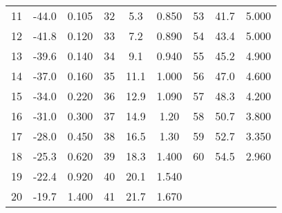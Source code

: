\begin{table}
\begin{tabular}{c c c@{\hskip 1cm}||@{\hskip 1cm} c c c@{\hskip 1cm} ||@{\hskip 1cm} c c c}
11   & -44.0   &    0.105 & 32      &  5.3       & 0.850  &  53  &      41.7  &           5.000    \\
12   & -41.8   &    0.120  & 33      &  7.2       & 0.890  &  54  &      43.4  &           5.000  \\
13   & -39.6   &    0.140  & 34      &  9.1       & 0.940  &  55  &      45.2  &           4.900 \\
14   & -37.0     &    0.160  & 35      &  11.1      & 1.000     &  56  &      47.0  &           4.600 \\
15   & -34.0   &    0.220  & 36      &  12.9      & 1.090  &  57  &      48.3  &           4.200 \\
16   & -31.0     &    0.300   & 37      &  14.9      & 1.20   &  58  &      50.7  &           3.800 \\
17   & -28.0     &    0.450  & 38      &  16.5      & 1.30   &  59  &      52.7  &           3.350 \\
18   & -25.3   &    0.620  & 39      &  18.3      & 1.400   &  60  &      54.5  &           2.960 \\
19   & -22.4   &    0.920  & 40      &  20.1      & 1.540  & & & \\
20   & -19.7   &    1.400   & 41      &  21.7      & 1.670  & & & \\
    \end{tabular}
\end{table}

